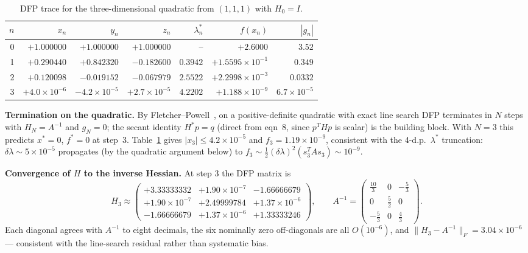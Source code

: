 \documentclass[11pt,a4paper]{article}
\begin{document}
\begin{table}[htbp]
\centering
\caption{DFP trace for the three-dimensional quadratic from \((1,1,1)\) with \(H_{0}=I\).}
\label{tab:q6-trace}
\begin{tabular}{rrrrrrr}
\toprule
\(n\) & \(x_n\) & \(y_n\) & \(z_n\) & \(\lambda_n^\ast\) & \(f(x_n)\) & \(|g_n|\)\\
\midrule
0 & \(+1.000000\) & \(+1.000000\) & \(+1.000000\) & --       & \(+2.6000\)                   & \(3.52\)\\
1 & \(+0.290440\) & \(+0.842320\) & \(-0.182600\) & \(0.3942\) & \(+1.5595\!\times\!10^{-1}\) & \(0.349\)\\
2 & \(+0.120098\) & \(-0.019152\) & \(-0.067979\) & \(2.5522\) & \(+2.2998\!\times\!10^{-3}\) & \(0.0332\)\\
3 & \(+4.0\!\times\!10^{-6}\) & \(-4.2\!\times\!10^{-5}\) & \(+2.7\!\times\!10^{-5}\) & \(4.2202\) & \(+1.188\!\times\!10^{-9}\) & \(6.7\!\times\!10^{-5}\)\\
\bottomrule
\end{tabular}
\end{table}

\textbf{Termination on the quadratic.}
By Fletcher--Powell~\cite{fletcher-powell}, on a positive-definite quadratic with exact line search DFP terminates in \(N\) steps with \(H_{N}=A^{-1}\) and \(g_{N}=0\); the secant identity \(H^{\ast}p=q\) (direct from eqn~8, since \(p^{T}Hp\) is scalar) is the building block. With \(N=3\) this predicts \(x^{\ast}=0\), \(f^{\ast}=0\) at step~3. Table~\ref{tab:q6-trace} gives \(|x_{3}|\le 4.2\!\times\!10^{-5}\) and \(f_{3}=1.19\!\times\!10^{-9}\), consistent with the 4-d.p.\ \(\lambda^{\ast}\) truncation: \(\delta\lambda\sim 5\!\times\!10^{-5}\) propagates (by the quadratic argument below) to \(f_{3}\sim\tfrac12(\delta\lambda)^{2}(s_{3}^{T}\!A s_{3})\sim 10^{-9}\).

\textbf{Convergence of \(H\) to the inverse Hessian.}
At step \(3\) the DFP matrix is
\[
H_{3}\approx
\begin{pmatrix}
+3.33333332 & +1.90\!\times\!10^{-7} & -1.66666679\\
+1.90\!\times\!10^{-7} & +2.49999784 & +1.37\!\times\!10^{-6}\\
-1.66666679 & +1.37\!\times\!10^{-6} & +1.33333246
\end{pmatrix},
\qquad
A^{-1}=
\begin{pmatrix}
\tfrac{10}{3} & 0 & -\tfrac{5}{3}\\
0 & \tfrac{5}{2} & 0\\
-\tfrac{5}{3} & 0 & \tfrac{4}{3}
\end{pmatrix}.
\]
Each diagonal agrees with \(A^{-1}\) to eight decimals, the six nominally zero off-diagonals are all \(O(10^{-6})\), and \(\|H_{3}-A^{-1}\|_{F}=3.04\!\times\!10^{-6}\) --- consistent with the line-search residual rather than systematic bias.
\end{document}
